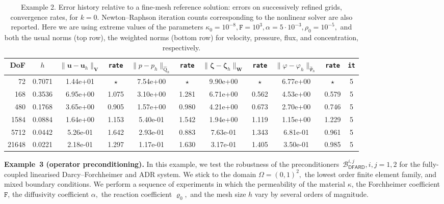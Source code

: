 \documentclass[11pt, reqno, a4paper, twoside]{article}
\newcommand{\bu}{\boldsymbol{u}}
\newcommand\bzeta{\boldsymbol{\zeta}}
\newcommand{\rF}{\mathtt{F}}
\newcommand{\rQ}{\mathrm{Q}}
\newcommand{\bW}{\mathbf{W}}
\newcommand{\bV}{\mathbf{V}}
\newcommand{\cB}{\mathcal{B}}
\numberwithin{equation}{section}
\numberwithin{remark}{section}
\numberwithin{figure}{section}
\numberwithin{table}{section}
\begin{document}
\begin{table}[!t]
{\begin{tabular}{|rcccccccccc|}
DoF  &    $h$ & $\|\bu-\bu_h\|_{\bV}\!$  &  \texttt{rate} &  $\|p-p_h\|_{\widehat{\rQ}_h}$  &  \texttt{rate} & \(\|\bzeta-\bzeta_h\|_{\bW}\)& \texttt{rate} &\(\|\varphi-\varphi_h\|_{\widehat{\Psi}_h}\)&\texttt{rate} &  \texttt{it} \\
\hline
     72 & 0.7071 & 1.44e+01 & $\star$ & 7.54e+00 & $\star$ & 9.90e+00 & $\star$ & 6.77e+00 & $\star$ & 5 \\
    168 & 0.3536 & 6.95e+00 & 1.075 & 3.10e+00 & 1.281 & 6.71e+00 & 0.562 & 4.53e+00 & 0.579 & 5 \\
    480 & 0.1768 & 3.65e+00 & 0.905 & 1.57e+00 & 0.980 & 4.21e+00 & 0.673 & 2.70e+00 & 0.746 & 5\\
   1584 & 0.0884 & 1.64e+00 & 1.153 & 5.40e-01 & 1.542 & 1.94e+00 & 1.119 & 1.15e+00 & 1.229 & 5\\
   5712 & 0.0442 & 5.26e-01 & 1.642 & 2.93e-01 & 0.883 & 7.63e-01 & 1.343 & 6.81e-01 & 0.961 & 5\\
  21648 & 0.0221 & 2.18e-01 & 1.297 & 1.17e-01 & 1.630 & 3.17e-01 & 1.405 & 3.50e-01 & 0.985 & 5 \\
\hline
\end{tabular}}
\caption{Example 2. Error history relative to a fine-mesh reference solution: errors on successively refined grids, convergence rates, for $k=0$.  Newton--Raphson iteration counts corresponding to the nonlinear solver are also reported. Here we are using extreme values of the parameters \(\kappa_0=10^{-8},\rF=10^{3},\alpha=5\cdot 10^{-3},\rho_0=10^{-5},\) and both the usual norms (top row), the weighted norms (bottom row) for velocity, pressure, flux, and concentration, respectively.} \label{num:conv.rates}
\end{table}


\smallskip
\noindent\textbf{Example~3 (operator preconditioning).} In this example, we test the robustness of the preconditioners~{$\cB^{i,j}_{\mathsf{DFARD}},i,j=1,2$} for the fully-coupled linearised Darcy--Forchheimer and ADR system.  We stick to the domain \(\Omega=(0,1)^2,\) the lowest order
finite element family, and mixed boundary conditions. We perform a sequence of experiments in which the permeability of the material \(\kappa\), the Forchheimer coefficient   \(\rF\), the diffusivity coefficient \(\alpha,\)  the reaction coefficient \(\varrho_0,\) and the mesh size $h$ vary by several orders of magnitude.  
\end{document}
